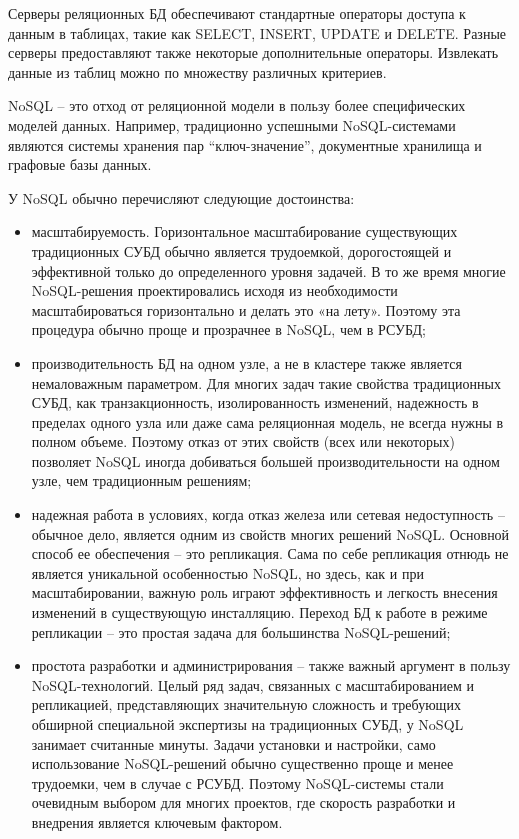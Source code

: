 Серверы реляционных БД обеспечивают стандартные операторы доступа к данным в таблицах, такие как SELECT, INSERT, UPDATE и DELETE. Разные серверы предоставляют также некоторые дополнительные операторы. Извлекать данные из таблиц можно по множеству различных критериев.

NoSQL – это отход от реляционной модели в пользу более специфических моделей данных. Например, традиционно успешными NoSQL-системами являются системы хранения пар “ключ-значение”, документные хранилища и графовые базы данных.

У NoSQL обычно перечисляют следующие достоинства:
\begin{itemize}
  \item масштабируемость. Горизонтальное масштабирование существующих традиционных СУБД обычно является трудоемкой, дорогостоящей и эффективной только до определенного уровня задачей. В то же время многие NoSQL-решения проектировались исходя из необходимости масштабироваться горизонтально и делать это «на лету». Поэтому эта процедура обычно проще и прозрачнее в NoSQL, чем в РСУБД;
  \item производительность БД на одном узле, а не в кластере также является немаловажным параметром. Для многих задач такие свойства традиционных СУБД, как транзакционность, изолированность изменений, надежность в пределах одного узла или даже сама реляционная модель, не всегда нужны в полном объеме. Поэтому отказ от этих свойств (всех или некоторых) позволяет NoSQL иногда добиваться большей производительности на одном узле, чем традиционным решениям;
  \item надежная работа в условиях, когда отказ железа или сетевая недоступность – обычное дело, является одним из свойств многих решений NoSQL. Основной способ ее обеспечения – это репликация. Сама по себе репликация отнюдь не является уникальной особенностью NoSQL, но здесь, как и при масштабировании, важную роль играют эффективность и легкость внесения изменений в существующую инсталляцию. Переход БД к работе в режиме репликации – это простая задача для большинства NoSQL-решений;
  \item простота разработки и администрирования – также важный аргумент в пользу NoSQL-технологий. Целый ряд задач, связанных с масштабированием и репликацией, представляющих значительную сложность и требующих обширной специальной экспертизы на традиционных СУБД, у NoSQL занимает считанные минуты. Задачи установки и настройки, само использование NoSQL-решений обычно существенно проще и менее трудоемки, чем в случае с РСУБД. Поэтому NoSQL-системы стали очевидным выбором для многих проектов, где скорость разработки и внедрения является ключевым фактором.
\end{itemize}

